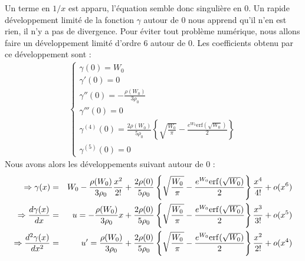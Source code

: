 	Un terme en $1/x$ est apparu, l'équation semble donc singulière en $0$. Un rapide
	développement limité de la fonction $\gamma$ autour de $0$ nous apprend qu'il n'en est rien, il n'y a
	pas de divergence. Pour éviter tout problème numérique, nous allons faire un développement limité d'ordre 6 autour de $0$.
	Les coefficients obtenu par ce développement sont :
	\begin{eqnarray}
		\left\{\begin{array}{l}
			\gamma(0) = W_0 \\
			\gamma'(0) = 0 \\
			\gamma''(0) = -\frac{\rho(W_0)}{3\rho_0} \\
			\gamma'''(0) = 0 \\
			\gamma^{(4)}(0) = \frac{2\rho(W_0)}{5\rho_0}\left\{\sqrt{\frac{W_0}{\pi}} -
			\frac{e^{W_0}\mathrm{erf}(\sqrt{W_0})}{2}\right\} \\
			\gamma^{(5)}(0) = 0
		\end{array}\right.
	\end{eqnarray}
	Nous avons alors les développements suivant autour de $0$ :
	\begin{align}
		\Rightarrow \gamma(x) &=& W_0 - \frac{\rho(W_0)}{3\rho_0}\frac{x^2}{2!} + \frac{2\rho(0)}{5\rho_0}\left\{\sqrt{\frac{W_0}{\pi}} -
		\frac{e^{W_0}\mathrm{erf}(\sqrt{W_0})}{2}\right\}\frac{x^4}{4!} + o(x^6) \notag \\
		\Rightarrow \frac{d\gamma(x)}{dx} &=& u = - \frac{\rho(W_0)}{3\rho_0}x + \frac{2\rho(0)}{5\rho_0}\left\{\sqrt{\frac{W_0}{\pi}} -
		\frac{e^{W_0}\mathrm{erf}(\sqrt{W_0})}{2}\right\}\frac{x^3}{3!} + o(x^5) \notag \\
		\Rightarrow \frac{d^2\gamma(x)}{dx^2} &=& u' = \frac{\rho(W_0)}{3\rho_0} + \frac{2\rho(0)}{5\rho_0}\left\{\sqrt{\frac{W_0}{\pi}} -
		\frac{e^{W_0}\mathrm{erf}(\sqrt{W_0})}{2}\right\}\frac{x^2}{2!} + o(x^4) \notag
	\end{align}

